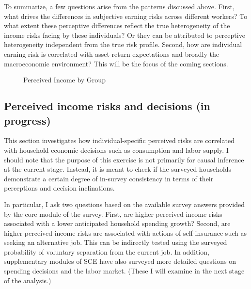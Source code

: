 \documentclass[12pt,notitlepage,onecolumn,aps,pra]{article}
\begin{document}
To summarize, a few questions arise from the patterns discussed above.
First, what drives the differences in subjective earning risks across
different workers? To what extent these perceptive differences reflect
the true heterogeneity of the income risks facing by these individuals?
Or they can be attributed to perceptive heterogeneity independent from
the true risk profile. Second, how are individual earning risk is
correlated with asset return expectations and broadly the macroeconomic
environment? This will be the focus of the coming sections.


    \begin{figure*}[!ht]
        \begin{center}\end{center}
        \caption{Perceived Income by Group}
        \label{fig:boxplotbygroup}
    \end{figure*}
    


    \hypertarget{perceived-income-risks-and-decisions-in-progress}{%
\subsection{Perceived income risks and decisions (in
progress)}\label{perceived-income-risks-and-decisions-in-progress}}

This section investigates how individual-specific perceived risks are
correlated with household economic decisions such as consumption and
labor supply. I should note that the purpose of this exercise is not
primarily for causal inference at the current stage. Instead, it is
meant to check if the surveyed households demonstrate a certain degree
of in-survey consistency in terms of their perceptions and decision
inclinations.

In particular, I ask two questions based on the available survey answers
provided by the core module of the survey. First, are higher perceived
income risks associated with a lower anticipated household spending
growth? Second, are higher perceived income risks are associated with
actions of self-insurance such as seeking an alternative job. This can
be indirectly tested using the surveyed probability of voluntary
separation from the current job. In addition, supplementary modules of
SCE have also surveyed more detailed questions on spending decisions and
the labor market. (These I will examine in the next stage of the
analysis.)
\end{document}
